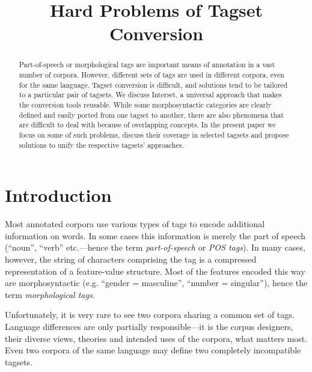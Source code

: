 \documentclass[11pt]{article}
\title{Hard Problems of Tagset Conversion%
}
\author{%
}
\date{}
\begin{document}
\maketitle
\thispagestyle{fancy}
\lstset{language=Perl}
\lstset{basicstyle=\ttfamily} %

\begin{abstract}
Part-of-speech or morphological tags are important means of annotation in a vast number of corpora. However, different sets of tags are used in different corpora, even for the same language. Tagset conversion is difficult, and solutions tend to be tailored to a particular pair of tagsets. We discuss Interset, a universal approach that makes the conversion tools reusable. While some morphosyntactic categories are clearly defined and easily ported from one tagset to another, there are also phenomena that are difficult to deal with because of overlapping concepts. In the present paper we focus on some of such problems, discuss their coverage in selected tagsets and propose solutions to unify the respective tagsets' approaches.
\end{abstract}

\section{Introduction}
\label{sec:intro}

Most annotated corpora use various types of tags to encode additional information on words. In some cases this information is merely the part of speech (“noun”, “verb” etc.—hence the term \textit{part-of-speech} or \textit{POS tags}). In many cases, however, the string of characters comprising the tag is a compressed representation of a feature-value structure. Most of the features encoded this way are morphosyntactic (e.g. “gender = masculine”, “number = singular”), hence the term \textit{morphological tags}.

Unfortunately, it is very rare to see two corpora sharing a common set of tags. Language differences are only partially responsible—it is the corpus designers, their diverse views, theories and intended uses of the corpora, what matters most. Even two corpora of the same language may define two completely incompatible tagsets.
\end{document}
